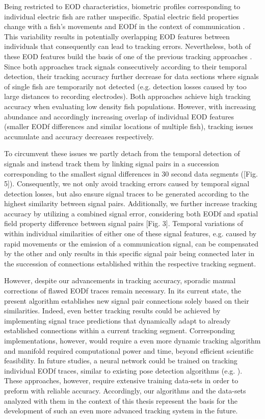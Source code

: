 \documentclass[11pt,pdftex]{article}
\newcommand{\note}[2][]{\textcolor{red!80!black}{[\textbf{\ifthenelse{\equal{#1}{}}{}{#1: }}#2]}}
\newcommand{\notetr}[1]{\note[TR]{#1}}
\begin{document}
Being restricted to EOD characteristics, biometric profiles corresponding to individual electric fish are rather unspecific. Spatial electric field properties change with a fish's movements \citep{Madhav2018} and EODf in the context of communication \citep{Zupanc2002, Triefenbach2008, Smith2013}. This variability results in potentially overlapping EOD features between individuals that consequently can lead to tracking errors. Nevertheless, both of these EOD features build the basis of one of the previous tracking approaches \citep{Madhav2018, Henninger2020}. Since both approaches track signals consecutively according to their temporal detection, their tracking accuracy further decrease for data sections where signals of single fish are temporarily not detected (e.g. detection losses caused by too large distances to recording electrodes). Both approaches achieve high tracking accuracy when evaluating low density fish populations. However, with increasing abundance and accordingly increasing overlap of individual EOD features (smaller EODf differences and similar locations of multiple fish), tracking issues accumulate and accuracy decreases respectively.

To circumvent these issues we partly detach from the temporal detection of signals and instead track them by linking signal pairs in a succession corresponding to the smallest signal differences in 30 second data segments (\notetr{Fig. 5}). Consequently, we not only avoid tracking errors caused by temporal signal detection losses, but also ensure signal traces to be generated according to the highest similarity between signal pairs. Additionally, we further increase tracking accuracy by utilizing a combined signal error, considering both EODf and spatial field property difference between signal pairs \notetr{Fig. 3}. Temporal variations of within individual similarities of either one of these signal features, e.g. caused by rapid movements or the emission of a communication signal, can be compensated by the other and only results in this specific signal pair being connected later in the succession of connections established within the respective tracking segment. 

However, despite our advancements in tracking accuracy, sporadic manual corrections of flawed EODf traces remain necessary. In its current state, the present algorithm establishes new signal pair connections solely based on their similarities. Indeed, even better tracking results could be achieved by implementing signal trace predictions that dynamically adapt to already established connections within a current tracking segment. Corresponding implementations, however, would require a even more dynamic tracking algorithm and manifold required computational power and time, beyond efficient scientific feasibility. In future studies, a neural network could be trained on tracking individual EODf traces, similar to existing pose detection algorithms (e.g. \citealp{Mathis2018}). These approaches, however,  require extensive training data-sets in order to preform with reliable accuracy. Accordingly, our algorithms and the data-sets analyzed with them in the context of this thesis represent the basis for the development of such an even more advanced tracking system in the future.
\end{document}
